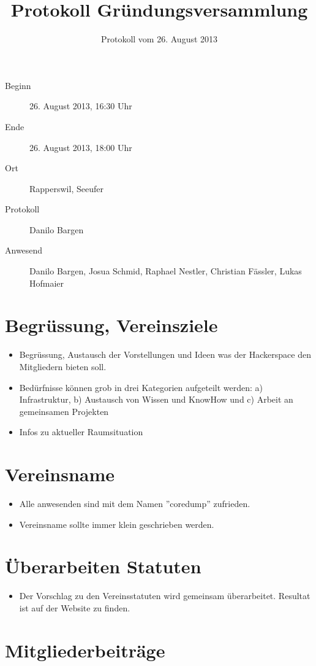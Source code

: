 \documentclass[10pt,a4paper,parskip,fleqn]{scrartcl}
\title{Protokoll Gründungsversammlung}
\date{Protokoll vom 26. August 2013}
\newcommand{\ul}{\begin{itemize}[itemsep=-0.3em,topsep=-0.3em]}
\newcommand{\lu}{\end{itemize}}
\newcommand{\li}{\item}
\begin{document}
\begin{titlepage}

	\maketitle
	\thispagestyle{empty} %

	\vfill

	\begin{description}
		\item[Beginn] 26. August 2013, 16:30 Uhr
		\item[Ende] 26. August 2013, 18:00 Uhr
		\item[Ort] Rapperswil, Seeufer
		\item[Protokoll] Danilo Bargen
		\item[Anwesend] Danilo Bargen, Josua Schmid, Raphael Nestler, Christian
			Fässler, Lukas Hofmaier
	\end{description}

\end{titlepage}


\section{Begrüssung, Vereinsziele}

\ul
	\li Begrüssung, Austausch der Vorstellungen und Ideen was der Hackerspace den
	Mitgliedern bieten soll.
	\li Bedürfnisse können grob in drei Kategorien aufgeteilt werden: a)
	Infrastruktur, b) Austausch von Wissen und KnowHow und c) Arbeit an
	gemeinsamen Projekten
	\li Infos zu aktueller Raumsituation
\lu


\section{Vereinsname}

\ul
	\li Alle anwesenden sind mit dem Namen ''coredump'' zufrieden.
	\li Vereinsname sollte immer klein geschrieben werden.
\lu


\section{Überarbeiten Statuten}

\ul
	\li Der Vorschlag zu den Vereinsstatuten wird gemeinsam überarbeitet. Resultat
	ist auf der Website zu finden.
\lu


\section{Mitgliederbeiträge}
\end{document}

